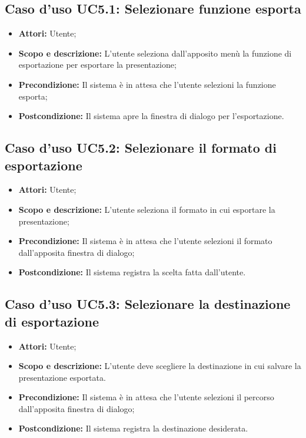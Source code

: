 \subsection{Caso d'uso UC5.1: Selezionare funzione esporta}
	\begin{itemize}
		\item \textbf{Attori:} Utente;
		\item \textbf{Scopo e descrizione:} L'utente seleziona dall'apposito menù la funzione di esportazione per esportare la presentazione;
		\item \textbf{Precondizione:} Il sistema è in attesa che l'utente selezioni la funzione esporta;
		\item \textbf{Postcondizione:} Il sistema apre la finestra di dialogo per l'esportazione.
	\end{itemize}


\subsection{Caso d'uso UC5.2: Selezionare il formato di esportazione}
	\begin{itemize}
		\item \textbf{Attori:} Utente;
		\item \textbf{Scopo e descrizione:} L'utente seleziona il formato in cui esportare la presentazione;
		\item \textbf{Precondizione:} Il sistema è in attesa che l'utente selezioni il formato dall'apposita finestra di dialogo;
		\item \textbf{Postcondizione:} Il sistema registra la scelta fatta dall'utente.
	\end{itemize}


\subsection{Caso d'uso UC5.3: Selezionare la destinazione di esportazione}
	\begin{itemize}
		\item \textbf{Attori:} Utente;
		\item \textbf{Scopo e descrizione:} L'utente deve scegliere la destinazione in cui salvare la presentazione esportata.
		\item \textbf{Precondizione:} Il sistema è in attesa che l'utente selezioni il percorso dall'apposita finestra di dialogo;
		\item \textbf{Postcondizione:} Il sistema registra la destinazione desiderata.
	\end{itemize}


